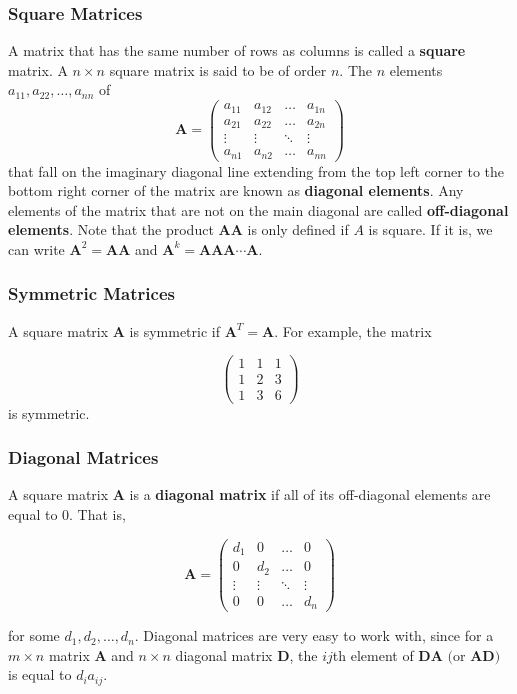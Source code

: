 \documentclass{beamer}
\begin{document}
\begin{frame}
\frametitle{Square Matrices}
A matrix that has the same number of rows as columns is called a \textbf{square} matrix.  A $n \times n$ square matrix is said to be of order $n$.  The $n$ elements $a_{11}, a_{22}, \hdots, a_{nn}$ of
\[\mathbf{A} = 
\begin{pmatrix}
    a_{11} & a_{12} & \dots  & a_{1n} \\
    a_{21} & a_{22}  & \dots  & a_{2n} \\
    \vdots & \vdots  & \ddots & \vdots \\
    a_{n1} & a_{n2}  & \dots  & a_{nn}
\end{pmatrix}
\]
 that fall on the imaginary diagonal line extending from the top left corner to the bottom right corner of the matrix are known as \textbf{diagonal elements}.  Any elements of the matrix that are not on the main diagonal are called \textbf{off-diagonal elements}.  Note that the product $\mathbf{AA}$ is only defined if $A$ is square.  If it is, we can write $\mathbf{A}^2 = \mathbf{AA}$ and $\mathbf{A}^k = \mathbf{AAA\cdots A}$.
\end{frame}

\begin{frame}
\frametitle{Symmetric Matrices}
A square matrix $\mathbf{A}$ is symmetric if $\mathbf{A}^T = \mathbf{A}$.  For example, the matrix

\[\begin{pmatrix}
    1 & 1 & 1\\
    1 & 2 & 3 \\
    1 & 3 & 6   
\end{pmatrix}
\]
is symmetric.
\end{frame}

\begin{frame}
\frametitle{Diagonal Matrices}
A square matrix $\mathbf{A}$ is a \textbf{diagonal matrix} if all of its off-diagonal elements are equal to 0.  That is,

\[\mathbf{A} = 
\begin{pmatrix}
    d_{1} & 0 & \dots  & 0 \\
    0 & d_{2}  & \dots  & 0 \\
    \vdots & \vdots  & \ddots & \vdots \\
    0 & 0  & \dots  & d_{n}
\end{pmatrix}
\]

for some $d_1, d_2, \hdots, d_n$.  Diagonal matrices are very easy to work with, since for a $m \times n$ matrix $\mathbf{A}$ and $n \times n$ diagonal matrix $\mathbf{D}$, the $ij$th element of $\mathbf{DA} \text{ (or }\mathbf{AD})$ is equal to $d_i a_{ij}$.  
\end{frame}
\end{document}
